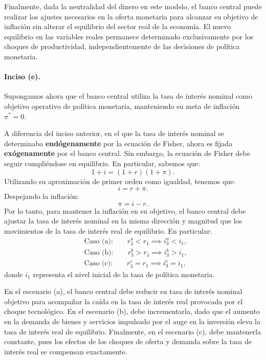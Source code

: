 \documentclass[11pt]{article}
\begin{document}
Finalmente, dada la neutralidad del dinero en este modelo, el banco central puede realizar los ajustes necesarios en la oferta monetaria para alcanzar su objetivo de inflación sin alterar el equilibrio del sector real de la economía. El nuevo equilibrio en las variables reales permanece determinado exclusivamente por los choques de productividad, independientemente de las decisiones de política monetaria.








\paragraph{Inciso (e).} Supongamos ahora que el banco central utiliza la tasa de interés nominal como objetivo operativo de política monetaria, manteniendo su meta de inflación $\pi^*=0$.

A diferencia del inciso anterior, en el que la tasa de interés nominal se determinaba \textbf{endógenamente} por la ecuación de Fisher, ahora es fijada \textbf{exógenamente} por el banco central. Sin embargo, la ecuación de Fisher debe seguir cumpliéndose en equilibrio. En particular, sabemos que:
\[
1+i=(1+r)(1+\pi).
\]
Utilizando su aproximación de primer orden como igualdad, tenemos que:
\[
i=r+\pi.
\]
Despejando la inflación:
\[
\pi=i-r.
\]
Por lo tanto, para mantener la inflación en su objetivo, el banco central debe ajustar la tasa de interés nominal en la misma dirección y magnitud que los movimientos de la tasa de interés real de equilibrio. En particular:
\begin{align*}
    &\text{Caso (a):}\qquad r_3^a<r_1
    \implies i_3^a<i_1, \\[4pt]
    &\text{Caso (b):}\qquad r_3^b>r_1
    \implies i_3^b>i_1, \\[4pt]
    &\text{Caso (c):}\qquad r_3^c=r_1
    \implies i_3^c=i_1,
\end{align*}
donde $i_1$ representa el nivel inicial de la tasa de política monetaria.

En el escenario (a), el banco central debe reducir su tasa de interés nominal objetivo para acompañar la caída en la tasa de interés real provocada por el choque tecnológico. En el escenario (b), debe incrementarla, dado que el aumento en la demanda de bienes y servicios impulsado por el auge en la inversión eleva la tasa de interés real de equilibrio. Finalmente, en el escenario (c), debe mantenerla constante, pues los efectos de los choques de oferta y demanda sobre la tasa de interés real se compensan exactamente.
\end{document}
